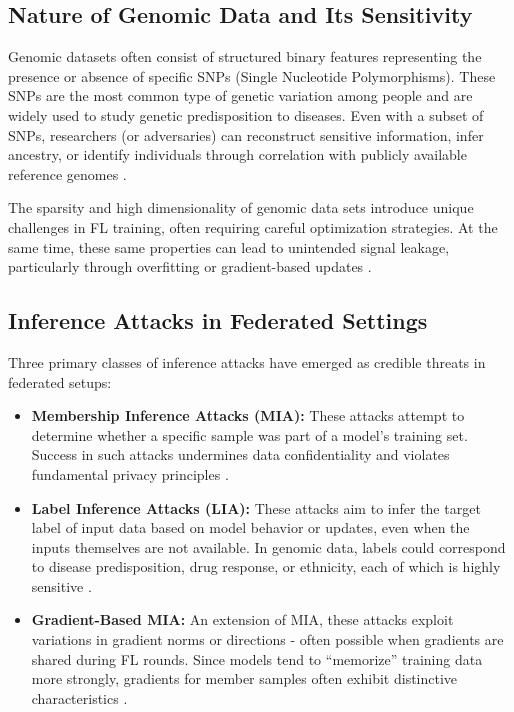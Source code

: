 \documentclass[conference]{IEEEtran}
\begin{document}
\subsection{Nature of Genomic Data and Its Sensitivity}

Genomic datasets often consist of structured binary features representing the presence or absence of specific SNPs (Single Nucleotide Polymorphisms). These SNPs are the most common type of genetic variation among people and are widely used to study genetic predisposition to diseases. Even with a subset of SNPs, researchers (or adversaries) can reconstruct sensitive information, infer ancestry, or identify individuals through correlation with publicly available reference genomes \cite{efficacy2024offederated10}.

The sparsity and high dimensionality of genomic data sets introduce unique challenges in FL training, often requiring careful optimization strategies. At the same time, these same properties can lead to unintended signal leakage, particularly through overfitting or gradient-based updates \cite{federated2024learning12}.

\subsection{Inference Attacks in Federated Settings}

Three primary classes of inference attacks have emerged as credible threats in federated setups:
\begin{itemize}
    \item \textbf{Membership Inference Attacks (MIA):} These attacks attempt to determine whether a specific sample was part of a model’s training set. Success in such attacks undermines data confidentiality and violates fundamental privacy principles \cite{nguyen2023active11}.
    \item \textbf{Label Inference Attacks (LIA):} These attacks aim to infer the target label of input data based on model behavior or updates, even when the inputs themselves are not available. In genomic data, labels could correspond to disease predisposition, drug response, or ethnicity, each of which is highly sensitive \cite{raimondi2023genome14}.
    \item \textbf{Gradient-Based MIA:} An extension of MIA, these attacks exploit variations in gradient norms or directions - often possible when gradients are shared during FL rounds. Since models tend to “memorize” training data more strongly, gradients for member samples often exhibit distinctive characteristics \cite{nguyen2023active11}.
\end{itemize}
\end{document}
